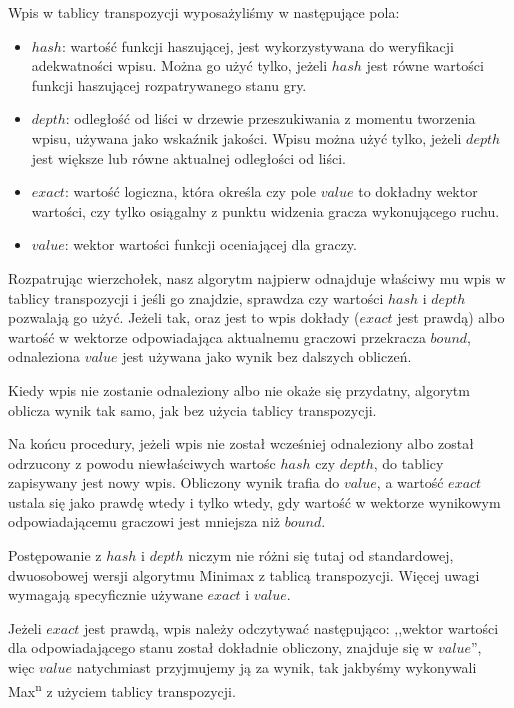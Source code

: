 \documentclass{pracamgr}
\begin{document}
Wpis w tablicy transpozycji wyposażyliśmy w następujące pola:

\begin{itemize}
\item{\(hash\): wartość funkcji haszującej, jest wykorzystywana do weryfikacji adekwatności wpisu. Można go użyć tylko, jeżeli \(hash\) jest równe wartości funkcji haszującej rozpatrywanego stanu gry.}
\item{\(depth\): odległość od liści w drzewie przeszukiwania z momentu tworzenia wpisu, używana jako wskaźnik jakości. Wpisu można użyć tylko, jeżeli \(depth\) jest większe lub równe aktualnej odległości od liści.}
\item{\(exact\): wartość logiczna, która określa czy pole \(value\) to dokładny wektor wartości, czy tylko osiągalny z punktu widzenia gracza wykonującego ruchu.}
\item{\(value\): wektor wartości funkcji oceniającej dla graczy.}
\end{itemize}

Rozpatrując wierzchołek, nasz algorytm najpierw odnajduje właściwy mu wpis w tablicy transpozycji i jeśli go znajdzie, sprawdza czy wartości \(hash\) i \(depth\) pozwalają go użyć.
Jeżeli tak, oraz jest to wpis dokłady (\(exact\) jest prawdą) albo wartość w wektorze odpowiadająca aktualnemu graczowi przekracza \(bound\), odnaleziona \(value\) jest używana jako wynik bez dalszych obliczeń.

Kiedy wpis nie zostanie odnaleziony albo nie okaże się przydatny, algorytm oblicza wynik tak samo, jak bez użycia tablicy transpozycji.

Na końcu procedury, jeżeli wpis nie został wcześniej odnaleziony albo został odrzucony z powodu niewłaściwych wartośc \(hash\) czy \(depth\), do tablicy zapisywany jest nowy wpis.
Obliczony wynik trafia do \(value\), a wartość \(exact\) ustala się jako prawdę wtedy i tylko wtedy, gdy wartość w wektorze wynikowym odpowiadającemu graczowi jest mniejsza niż \(bound\).

Postępowanie z \(hash\) i \(depth\) niczym nie różni się tutaj od standardowej, dwuosobowej wersji algorytmu Minimax z tablicą transpozycji.
Więcej uwagi wymagają specyficznie używane \(exact\) i \(value\).

Jeżeli \(exact\) jest prawdą, wpis należy odczytywać następująco: ,,wektor wartości dla odpowiadającego stanu został dokładnie obliczony, znajduje się w \(value\)'', więc \(value\) natychmiast przyjmujemy ją za wynik, tak jakbyśmy wykonywali Max\textsuperscript{n} z użyciem tablicy transpozycji.
\end{document}
